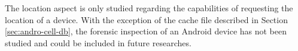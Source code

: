 The location aspect is only studied regarding the capabilities of requesting the location of a device.
With the exception of the cache file described in Section \ref{sec:andro-cell-db}, the forensic inspection of an Android device has not been studied and could be included in future researches.




